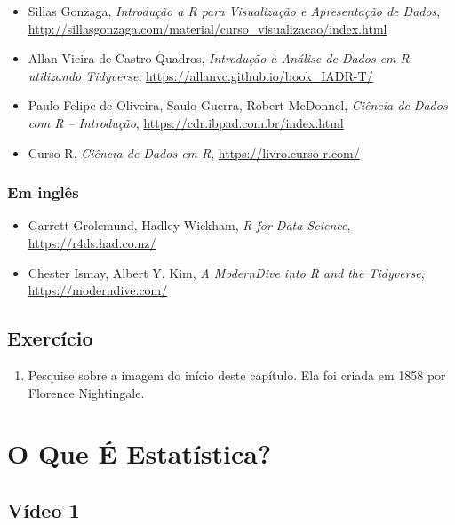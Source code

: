 \documentclass[
  11pt]{report}
\providecommand{\tightlist}{%
  \setlength{\itemsep}{0pt}\setlength{\parskip}{0pt}}
\begin{document}
\begin{itemize}
\item
  Sillas Gonzaga, \emph{Introdução a R para Visualização e Apresentação de Dados},
  \url{http://sillasgonzaga.com/material/curso_visualizacao/index.html}
\item
  Allan Vieira de Castro Quadros, \emph{Introdução à Análise de Dados em R utilizando Tidyverse}, \url{https://allanvc.github.io/book_IADR-T/}
\item
  Paulo Felipe de Oliveira, Saulo Guerra, Robert McDonnel, \emph{Ciência de Dados com R -- Introdução}, \url{https://cdr.ibpad.com.br/index.html}
\item
  Curso R, \emph{Ciência de Dados em R}, \url{https://livro.curso-r.com/}
\end{itemize}

\hypertarget{em-ingluxeas}{%
\subsection*{Em inglês}\label{em-ingluxeas}}

\begin{itemize}
\item
  Garrett Grolemund, Hadley Wickham, \emph{R for Data Science}, \url{https://r4ds.had.co.nz/}
\item
  Chester Ismay, Albert Y. Kim, \emph{A ModernDive into R and the Tidyverse}, \url{https://moderndive.com/}
\end{itemize}

\hypertarget{exercuxedcio}{%
\section*{Exercício}\label{exercuxedcio}}

\begin{enumerate}
\def\labelenumi{\arabic{enumi}.}
\tightlist
\item
  Pesquise sobre a imagem do início deste capítulo. Ela foi criada em 1858 por Florence Nightingale.
\end{enumerate}

\hypertarget{oque}{%
\chapter{O Que É Estatística?}\label{oque}}

\hypertarget{vuxeddeo-1}{%
\section{Vídeo 1}\label{vuxeddeo-1}}
\end{document}
